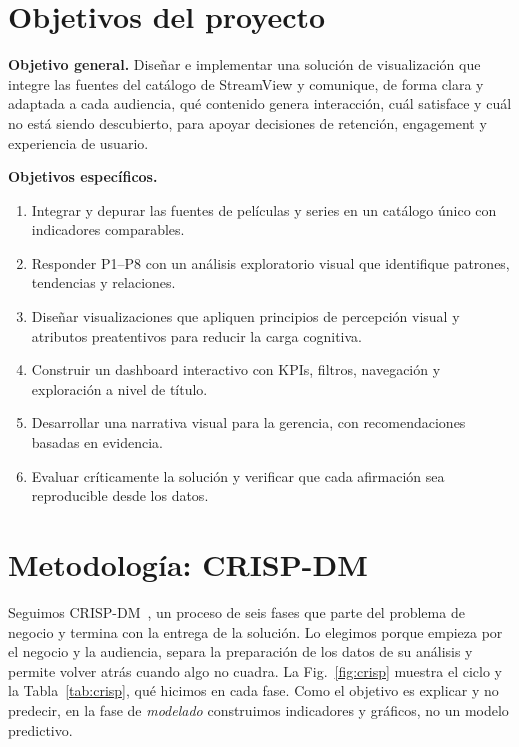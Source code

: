 \documentclass[conference,a4paper]{IEEEtran}
\begin{document}
\section{Objetivos del proyecto}
\label{sec:objetivos}

\textbf{Objetivo general.} Diseñar e implementar una solución de visualización que integre las fuentes del catálogo de StreamView y comunique, de forma clara y adaptada a cada audiencia, qué contenido genera interacción, cuál satisface y cuál no está siendo descubierto, para apoyar decisiones de retención, engagement y experiencia de usuario.

\textbf{Objetivos específicos.}
\begin{enumerate}
\item Integrar y depurar las fuentes de películas y series en un catálogo único con indicadores comparables.
\item Responder P1--P8 con un análisis exploratorio visual que identifique patrones, tendencias y relaciones.
\item Diseñar visualizaciones que apliquen principios de percepción visual y atributos preatentivos para reducir la carga cognitiva.
\item Construir un dashboard interactivo con KPIs, filtros, navegación y exploración a nivel de título.
\item Desarrollar una narrativa visual para la gerencia, con recomendaciones basadas en evidencia.
\item Evaluar críticamente la solución y verificar que cada afirmación sea reproducible desde los datos.
\end{enumerate}

\section{Metodología: CRISP-DM}
\label{sec:metodologia}

Seguimos CRISP-DM~\cite{chapman2000}, un proceso de seis fases que parte del problema de negocio y termina con la entrega de la solución. Lo elegimos porque empieza por el negocio y la audiencia, separa la preparación de los datos de su análisis y permite volver atrás cuando algo no cuadra. La Fig.~\ref{fig:crisp} muestra el ciclo y la Tabla~\ref{tab:crisp}, qué hicimos en cada fase. Como el objetivo es explicar y no predecir, en la fase de \emph{modelado} construimos indicadores y gráficos, no un modelo predictivo.
\end{document}
